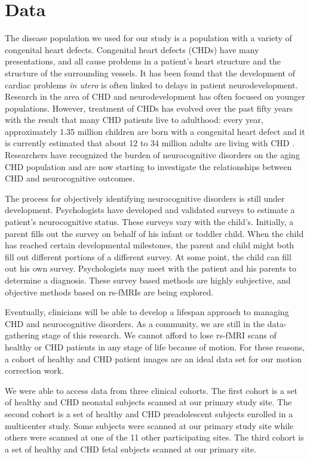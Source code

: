\section{Data}

The disease population we used for our study is a population with a variety of congenital heart defects. Congenital heart defects (CHDs) have many presentations, and all cause problems in a patient's heart structure and the structure of the surrounding vessels. It has been found that the development of cardiac problems \textit{in utero} is often linked to delays in patient neurodevelopment. Research in the area of CHD and neurodevelopment has often focused on younger populations. However, treatment of CHDs has evolved over the past fifty years with the result that many CHD patients live to adulthood: every year, approximately 1.35 million children are born with a congenital heart defect and it is currently estimated that about 12 to 34 million adults are living with CHD \cite{VanderLinde2011}. Researchers have recognized the burden of neurocognitive disorders on the aging CHD population and are now starting to investigate the relationships between CHD and neurocognitive outcomes.

The process for objectively identifying neurocognitive disorders is still under development. Psychologists have developed and validated surveys to estimate a patient's neurocognitive status. These surveys vary with the child's. Initially, a parent fills out the survey on behalf of his infant or toddler child. When the child has reached certain developmental milestones, the parent and child might both fill out different portions of a different survey. At some point, the child can fill out his own survey. Psychologists may meet with the patient and his parents to determine a diagnosis. These survey based methods are highly subjective, and objective methods based on rs-fMRIs are being explored. 

Eventually, clinicians will be able to develop a lifespan approach to managing CHD and neurocognitive disorders. As a community, we are still in the data-gathering stage of this research. We cannot afford to lose rs-fMRI scans of healthy or CHD patients in any stage of life because of motion. For these reasons, a cohort of healthy and CHD patient images are an ideal data set for our motion correction work. 

We were able to access data from three clinical cohorts. The first cohort is a set of healthy and CHD neonatal subjects scanned at our primary study site. The second cohort is a set of healthy and CHD preadolescent subjects enrolled in a multicenter study. Some subjects were scanned at our primary study site while others were scanned at one of the 11 other participating sites. The third cohort is a set of healthy and CHD fetal subjects scanned at our primary site.


